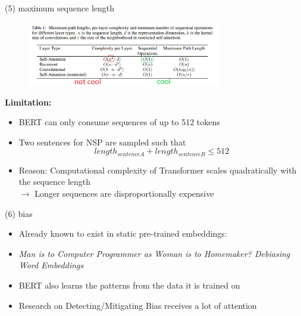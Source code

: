
\begin{frame}{(5) maximum sequence length}

\begin{figure}
\centering
\includegraphics[width = 8.5cm]{figure/bert-problem.png}\\ 
\end{figure}

\textbf{Limitation:}

\begin{itemize}
	\item BERT can only consume sequences of up to 512 tokens
	\item Two sentences for NSP are sampled such that $$length_{sentence A} + length_{sentence B} \leq 512$$
	\item Reason: Computational complexity of Transformer scales quadratically with the sequence length\\
				$\rightarrow$ Longer sequences are disproportionally expensive
\end{itemize}

\end{frame}


\begin{frame}{(6) bias}

\vfill

\begin{itemize}
	\item Already known to exist in static pre-trained embeddings:
	\item[] \textit{Man is to Computer Programmer as Woman is to Homemaker? Debiasing Word Embeddings} 
	\item BERT also learns the patterns from the data it is trained on
	\item Research on Detecting/Mitigating Bias receives a lot of attention
\end{itemize}


\vfill

\end{frame}

